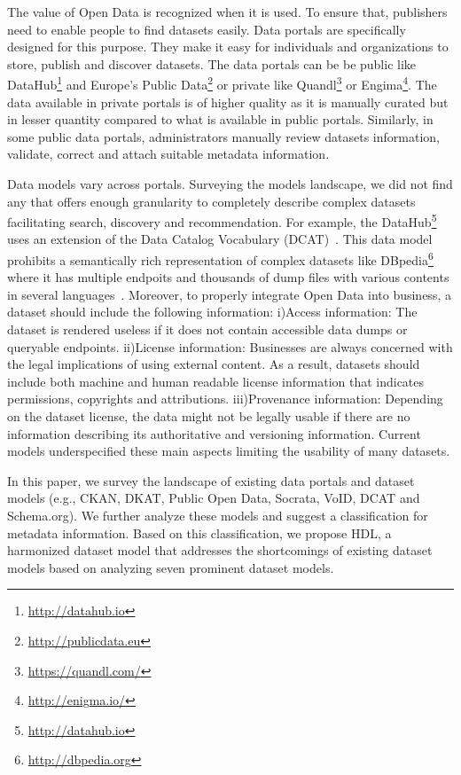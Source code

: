 \documentclass[runningheads,a4paper]{llncs}
\begin{document}
The value of Open Data is recognized when it is used. To ensure that, publishers need to enable people to find datasets easily. Data portals are specifically designed for this purpose. They make it easy for individuals and organizations to store, publish and discover datasets. The data portals can be be public like DataHub\footnote{\url{http://datahub.io}} and Europe's Public Data\footnote{\url{http://publicdata.eu}} or private like Quandl\footnote{\url{https://quandl.com/}} or Engima\footnote{\url{http://enigma.io/}}. The data available in private portals is of higher quality as it is manually curated but in lesser quantity compared to what is available in public portals. Similarly, in some public data portals, administrators manually review datasets information, validate, correct and attach suitable metadata information.

Data models vary across portals. Surveying the models landscape, we did not find any that offers enough granularity to completely describe complex datasets facilitating search, discovery and recommendation. For example, the DataHub\footnote{\url{http://datahub.io}} uses an extension of the Data Catalog Vocabulary (DCAT)~\cite{Erickson:14:DCV}. This data model prohibits a semantically rich representation of complex datasets like DBpedia\footnote{\url{http://dbpedia.org}} where it has multiple endpoits and thousands of dump files with various contents in several languages~\cite{Brummer:2014:DTS:2660517.2660538}. Moreover, to properly integrate Open Data into business, a dataset should include the following information: i)Access information: The dataset is rendered useless if it does not contain accessible data dumps or queryable endpoints. ii)License information: Businesses are always concerned with the legal implications of using external content. As a result, datasets should include both machine and human readable license information that indicates permissions, copyrights and attributions. iii)Provenance information: Depending on the dataset license, the data might not be legally usable if there are no information describing its authoritative and versioning information. Current models underspecified these main aspects limiting the usability of many datasets.

In this paper, we survey the landscape of existing data portals and dataset models (e.g., CKAN, DKAT, Public Open Data, Socrata, VoID, DCAT and Schema.org). We further analyze these models and suggest a classification for metadata information. Based on this classification, we propose HDL, a harmonized dataset model that addresses the shortcomings of existing dataset models based on analyzing seven prominent dataset models.
\end{document}

